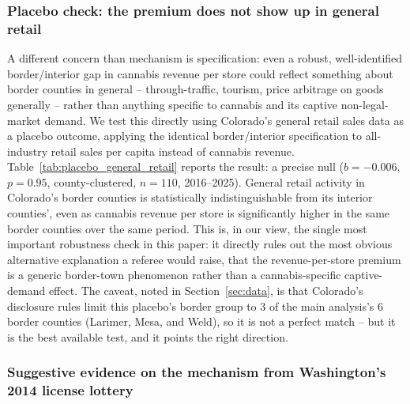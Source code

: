 ﻿\documentclass{article}
\begin{document}
\subsubsection{Placebo check: the premium does not show up in general retail}
\label{sec:placebo}

A different concern than mechanism is specification: even a robust, well-identified border/interior gap in
cannabis revenue per store could reflect something about border counties in general -- through-traffic,
tourism, price arbitrage on goods generally -- rather than anything specific to cannabis and its captive
non-legal-market demand. We test this directly using Colorado's general retail sales data
\citep{CDORRetailByCounty} as a placebo outcome, applying the identical border/interior specification to
all-industry retail sales per capita instead of cannabis revenue. Table~\ref{tab:placebo_general_retail}
reports the result: a precise null ($b=-0.006$, $p=0.95$, county-clustered, $n=110$, 2016--2025). General
retail activity in Colorado's border counties is statistically indistinguishable from its interior
counties', even as cannabis revenue per store is significantly higher in the same border counties over the
same period. This is, in our view, the single most important robustness check in this paper: it directly
rules out the most obvious alternative explanation a referee would raise, that the revenue-per-store
premium is a generic border-town phenomenon rather than a cannabis-specific captive-demand effect. The
caveat, noted in Section~\ref{sec:data}, is that Colorado's disclosure rules limit this placebo's border
group to 3 of the main analysis's 6 border counties (Larimer, Mesa, and Weld), so it is not a perfect
match -- but it is the best available test, and it points the right direction.



\subsubsection{Suggestive evidence on the mechanism from Washington's 2014 license lottery}
\label{sec:lottery}
\end{document}
